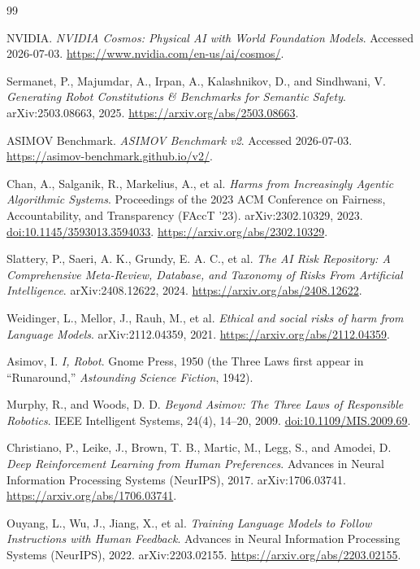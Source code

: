 \documentclass[11pt]{article}
\begin{document}
\begin{thebibliography}{99}

NVIDIA. \textit{NVIDIA Cosmos: Physical AI with World Foundation Models}. Accessed 2026-07-03. \url{https://www.nvidia.com/en-us/ai/cosmos/}.

Sermanet, P., Majumdar, A., Irpan, A., Kalashnikov, D., and Sindhwani, V. \textit{Generating Robot Constitutions \& Benchmarks for Semantic Safety}. arXiv:2503.08663, 2025. \url{https://arxiv.org/abs/2503.08663}.

ASIMOV Benchmark. \textit{ASIMOV Benchmark v2}. Accessed 2026-07-03. \url{https://asimov-benchmark.github.io/v2/}.

Chan, A., Salganik, R., Markelius, A., et al. \textit{Harms from Increasingly Agentic Algorithmic Systems}. Proceedings of the 2023 ACM Conference on Fairness, Accountability, and Transparency (FAccT '23). arXiv:2302.10329, 2023. \href{https://doi.org/10.1145/3593013.3594033}{doi:10.1145/3593013.3594033}. \url{https://arxiv.org/abs/2302.10329}.

Slattery, P., Saeri, A. K., Grundy, E. A. C., et al. \textit{The AI Risk Repository: A Comprehensive Meta-Review, Database, and Taxonomy of Risks From Artificial Intelligence}. arXiv:2408.12622, 2024. \url{https://arxiv.org/abs/2408.12622}.

Weidinger, L., Mellor, J., Rauh, M., et al. \textit{Ethical and social risks of harm from Language Models}. arXiv:2112.04359, 2021. \url{https://arxiv.org/abs/2112.04359}.

Asimov, I. \textit{I, Robot}. Gnome Press, 1950 (the Three Laws first appear in ``Runaround,'' \textit{Astounding Science Fiction}, 1942).

Murphy, R., and Woods, D. D. \textit{Beyond Asimov: The Three Laws of Responsible Robotics}. IEEE Intelligent Systems, 24(4), 14--20, 2009. \href{https://doi.org/10.1109/MIS.2009.69}{doi:10.1109/MIS.2009.69}.

Christiano, P., Leike, J., Brown, T. B., Martic, M., Legg, S., and Amodei, D. \textit{Deep Reinforcement Learning from Human Preferences}. Advances in Neural Information Processing Systems (NeurIPS), 2017. arXiv:1706.03741. \url{https://arxiv.org/abs/1706.03741}.

Ouyang, L., Wu, J., Jiang, X., et al. \textit{Training Language Models to Follow Instructions with Human Feedback}. Advances in Neural Information Processing Systems (NeurIPS), 2022. arXiv:2203.02155. \url{https://arxiv.org/abs/2203.02155}.


\end{thebibliography}
\end{document}
